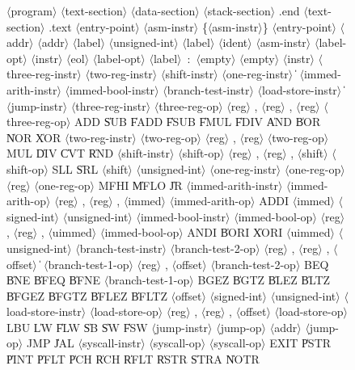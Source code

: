 \documentclass[11pt,letterpaper]{article}
\renewcommand{\nonterm}[1]{\mbox{$\langle$\textrm{#1}$\rangle$}}
\renewcommand{\arbno}[1]{\{#1\}}
\begin{document}
\begin{figure}
\begin{grammar}%
\nonterm{program} \: \nonterm{text-section} \nonterm{data-section} \nonterm{stack-section} .end
\nonterm{text-section} \: .text \nonterm{entry-point} \nonterm{asm-instr} \arbno{\nonterm{asm-instr}}
\nonterm{entry-point} \: \nonterm{addr}
\nonterm{addr} \: \nonterm{label} \| \nonterm{unsigned-int} 
\nonterm{label} \: \nonterm{ident}
\nonterm{asm-instr} \: \nonterm{label-opt} \nonterm{instr} \nonterm{eol}
\nonterm{label-opt} \: \nonterm{label}~:~\| \nonterm{empty}
\nonterm{empty} \:
\nonterm{instr} \: \nonterm{three-reg-instr} \| \nonterm{two-reg-instr} \| \nonterm{shift-instr} \| \nonterm{one-reg-instr}
\> \| \> \nonterm{immed-arith-instr} \| \nonterm{immed-bool-instr} \| \nonterm{branch-test-instr} \| \nonterm{load-store-instr}
\> \| \> \nonterm{jump-instr}
\nonterm{three-reg-instr} \: \nonterm{three-reg-op} \nonterm{reg} , \nonterm{reg} , \nonterm{reg}
\nonterm{three-reg-op} \: ADD \| SUB \| FADD \| FSUB \| FMUL \| FDIV \| AND \| BOR \| NOR \| XOR
\nonterm{two-reg-instr} \: \nonterm{two-reg-op} \nonterm{reg} , \nonterm{reg}
\nonterm{two-reg-op} \: MUL \| DIV \| CVT \| RND
\nonterm{shift-instr} \: \nonterm{shift-op} \nonterm{reg} , \nonterm{reg} , \nonterm{shift}
\nonterm{shift-op} \: SLL \| SRL
\nonterm{shift} \: \nonterm{unsigned-int}
\nonterm{one-reg-instr} \: \nonterm{one-reg-op} \nonterm{reg}
\nonterm{one-reg-op} \: MFHI \| MFLO \| JR
\nonterm{immed-arith-instr} \: \nonterm{immed-arith-op} \nonterm{reg} , \nonterm{reg} , \nonterm{immed}
\nonterm{immed-arith-op} \: ADDI
\nonterm{immed} \: \nonterm{signed-int} \| \nonterm{unsigned-int}
\nonterm{immed-bool-instr} \: \nonterm{immed-bool-op} \nonterm{reg} , \nonterm{reg} , \nonterm{uimmed}
\nonterm{immed-bool-op} \: ANDI \| BORI \| XORI
\nonterm{uimmed} \: \nonterm{unsigned-int}
\nonterm{branch-test-instr} \: \nonterm{branch-test-2-op} \nonterm{reg} , \nonterm{reg} , \nonterm{offset} 
\> \| \> \nonterm{branch-test-1-op} \nonterm{reg} , \nonterm{offset} 
\nonterm{branch-test-2-op} \: BEQ \| BNE \| BFEQ \| BFNE
\nonterm{branch-test-1-op} \: BGEZ \| BGTZ \| BLEZ \| BLTZ \| BFGEZ \| BFGTZ \| BFLEZ \| BFLTZ 
\nonterm{offset} \: \nonterm{signed-int} \| \nonterm{unsigned-int}
\nonterm{load-store-instr} \: \nonterm{load-store-op} \nonterm{reg} , \nonterm{reg} , \nonterm{offset}
\nonterm{load-store-op} \: LBU \| LW \| FLW \| SB \| SW \| FSW
\nonterm{jump-instr} \: \nonterm{jump-op} \nonterm{addr}
\nonterm{jump-op} \: JMP \| JAL
\nonterm{syscall-instr} \: \nonterm{syscall-op}
\nonterm{syscall-op} \: EXIT \| PSTR \| PINT \| PFLT \| PCH \| RCH \| RFLT \| RSTR \| STRA \| NOTR

\end{grammar}
\end{figure}
\end{document}
